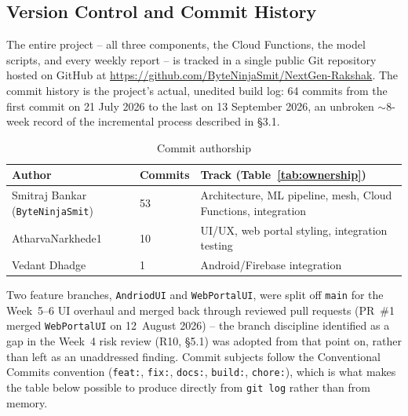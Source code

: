 \documentclass[12pt,a4paper,oneside]{report}
\begin{document}
\subsection{Version Control and Commit History}
\label{sec:vcs-history}

The entire project -- all three components, the Cloud Functions, the model
scripts, and every weekly report -- is tracked in a single public Git
repository hosted on GitHub at
\url{https://github.com/ByteNinjaSmit/NextGen-Rakshak}. The commit history
is the project's actual, unedited build log: 64 commits from the first
commit on 21 July 2026 to the last on 13 September 2026, an unbroken
$\sim$8-week record of the incremental process described in \S3.1.

\begin{table}[H]
\centering
\caption{Commit authorship}
\begin{tabular}{|p{5.4cm}|p{2.5cm}|p{5.0cm}|}
\hline
\textbf{Author} & \textbf{Commits} & \textbf{Track (Table~\ref{tab:ownership})} \\
\hline
Smitraj Bankar (\texttt{ByteNinjaSmit}) & 53 & Architecture, ML pipeline, mesh, Cloud Functions, integration \\ \hline
AtharvaNarkhede1 & 10 & UI/UX, web portal styling, integration testing \\ \hline
Vedant Dhadge & 1 & Android/Firebase integration \\
\hline
\end{tabular}
\end{table}

\noindent Two feature branches, \texttt{AndriodUI} and \texttt{WebPortalUI},
were split off \texttt{main} for the Week~5--6 UI overhaul and merged back
through reviewed pull requests (PR~\#1 merged \texttt{WebPortalUI} on
12~August 2026) -- the branch discipline identified as a gap in the Week~4
risk review (R10, \S5.1) was adopted from that point on, rather than left
as an unaddressed finding. Commit subjects follow the Conventional Commits
convention (\texttt{feat:}, \texttt{fix:}, \texttt{docs:}, \texttt{build:},
\texttt{chore:}), which is what makes the table below possible to produce
directly from \texttt{git log} rather than from memory.
\end{document}
